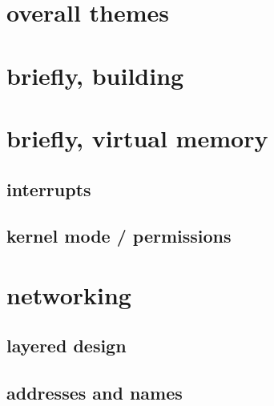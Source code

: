 \section{overall themes}


\section{briefly, building}



\section{briefly, virtual memory}






\subsection{interrupts}






\subsection{kernel mode / permissions}




\section{networking}


\subsection{layered design}



\subsection{addresses and names}

